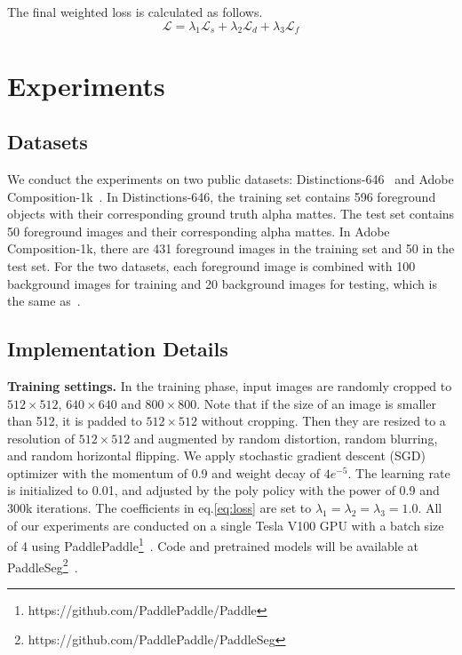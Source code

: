 \documentclass[10pt,twocolumn,letterpaper]{article}
\begin{document}
The final weighted loss is calculated as follows.
\begin{equation} \mathcal{L} = \lambda_1\mathcal{L}_{s} + \lambda_2\mathcal{L}_{d} + \lambda_3\mathcal{L}_{f} \label{eq:loss}
\end{equation}

\section{Experiments}

\subsection{Datasets}
We conduct the experiments on two public datasets: Distinctions-646~\cite{qiao2020attention} and Adobe Composition-1k~\cite{xu2017deep}. In Distinctions-646, the training set contains 596 foreground objects with their corresponding ground truth alpha mattes. The test set contains 50 foreground images and their corresponding alpha mattes. In Adobe Composition-1k, there are 431 foreground images in the training set and 50 in the test set. For the two datasets, each foreground image is combined with 100 background images for training and 20 background images for testing, which is the same as~\cite{xu2017deep}.

\subsection{Implementation Details}
\label{sec:imp}

\textbf{Training settings.} In the training phase, input images are randomly cropped to $512\times512$, $640\times640$ and $800\times800$. Note that if the size of an image is smaller than 512, it is padded to $512\times512$ without cropping. Then they are resized to a resolution of $512\times512$ and augmented by random distortion, random blurring, and random horizontal flipping. We apply stochastic gradient descent (SGD) optimizer with the momentum of 0.9 and weight decay of $4e^{-5}$. The learning rate is initialized to 0.01, and adjusted by the poly policy with the power of 0.9 and 300k iterations. The coefficients in eq.\ref{eq:loss} are set to $\lambda_1 = \lambda_2 = \lambda_3 = 1.0$. All of our experiments are conducted on a single Tesla V100 GPU with a batch size of 4 using PaddlePaddle\footnote{https://github.com/PaddlePaddle/Paddle}~\cite{ma2019paddlepaddle}. Code and pretrained models will be available at PaddleSeg\footnote{https://github.com/PaddlePaddle/PaddleSeg}~\cite{liu2021paddleseg}.
\end{document}
